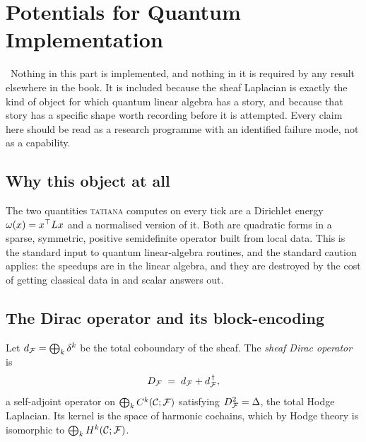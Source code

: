 \chapter{Potentials for Quantum Implementation}\label{ch:quantum}

\begin{hon}\Hon
\Proposed\ Nothing in this part is implemented, and nothing in it is
required by any result elsewhere in the book. It is included because the
sheaf Laplacian is exactly the kind of object for which quantum linear
algebra has a story, and because that story has a specific shape worth
recording before it is attempted. Every claim here should be read as a
research programme with an identified failure mode, not as a capability.
\end{hon}

\section{Why this object at all}

The two quantities \textsc{tatiana} computes on every tick are a
Dirichlet energy $\omega(x)=x^\top L x$ and a normalised version of
it. Both are quadratic forms in a sparse, symmetric, positive
semidefinite operator built from local data. This is the standard input
to quantum linear-algebra routines, and the standard caution applies:
the speedups are in the linear algebra, and they are destroyed by the
cost of getting classical data in and scalar answers out.

\section{The Dirac operator and its block-encoding}

\begin{definition}\label{def:dirac}
Let $d_{\mathcal{F}}=\bigoplus_k\delta^k$ be the total coboundary of the sheaf.
The \emph{sheaf Dirac operator} is
\[
  D_{\mathcal{F}} \;=\; d_{\mathcal{F}}+d_{\mathcal{F}}^{\,\dagger},
\]
a self-adjoint operator on $\bigoplus_k C^{k}(\mathcal{C};\mathcal{F})$ satisfying
$D_{\mathcal{F}}^2=\Delta$, the total Hodge Laplacian. Its kernel is the space of
harmonic cochains, which by Hodge theory is isomorphic to
$\bigoplus_k H^{k}(\mathcal{C};\mathcal{F})$.
\end{definition}

